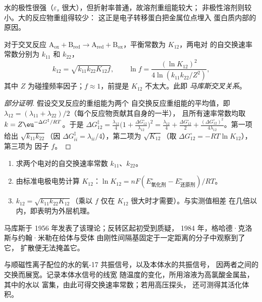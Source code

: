 \admitted

水的极性很强（$\varepsilon_s$ 很大），但折射率普通，故溶剂重组能较大；
非极性溶剂则较小。大的反应物重组得较少：
这正是电子转移蛋白把金属位点埋入
蛋白质内部的原因。

\begin{theorem}[马库斯交叉关系]\label{thm:b3:complex-mechanisms:cross-relation}
对于交叉反应 $\mathrm{A_{ox} + B_{red} \to A_{red} + B_{ox}}$，平衡常数为 $K_{12}$，两电对
的自交换速率常数分别为 $k_{11}$ 和 $k_{22}$，
\[
  k_{12} = \sqrt{k_{11}k_{22}K_{12}f}, \qquad \ln f = \frac{(\ln K_{12})^2}{4\ln(k_{11}k_{22}/Z^2)},
\]
其中 $Z$ 为碰撞频率因子；$f \approx 1$，前提是 $K_{12}$ 不太大。此即
\emph{马库斯交叉关系}。
\end{theorem}

\begin{proof}[部分证明]
假设交叉反应的重组能为两个
自交换反应重组能的平均值，即 $\lambda_{12} = (\lambda_{11} + \lambda_{22})/2$（每个反应物贡献其自身的一半），
且所有速率常数均取 $k = Z\eu^{-\Delta G^{\ddagger}/RT}$。于是
$\Delta G_{12}^{\ddagger} = \frac{\lambda_{12}}{4}\bigl(1 + \frac{\Delta G^\circ_{12}}{\lambda_{12}}\bigr)^2 = \frac{\lambda_{12}}{4} + \frac{\Delta G^\circ_{12}}{2} + \frac{(\Delta G^\circ_{12})^2}{4\lambda_{12}}$。第一项给出
$\sqrt{k_{11}k_{22}}$（因 $\Delta G^{\ddagger}_{ii} = \lambda_{ii}/4$），第二项为 $\sqrt{K_{12}}$（取 $\Delta G^\circ_{12} = -RT\ln K_{12}$），第三项为
因子 $f$。
\end{proof}

\begin{method}[由自交换数据求交叉反应速率]\label{met:b3:complex-mechanisms:marcus-estimate}
\begin{enumerate}
  \item 求两个电对的自交换速率常数 $k_{11}$、$k_{22}$。
  \item 由标准电极电势计算 $K_{12}$：$\ln K_{12} = nF(E^\circ_{\text{氧化剂}} - E^\circ_{\text{还原剂}})/RT$。
  \item $k_{12} = \sqrt{k_{11}k_{22}K_{12}}$（乘以 $f$ 仅在 $K_{12}$ 很大时才需要）。与实测值相差
        在几倍以内，即表明为外层机理。
\end{enumerate}
\end{method}

马库斯于 1956 年发表了该理论；反转区起初受到质疑，
1984 年，格哈德·克洛斯与约翰·米勒在给体与受体
由刚性间隔基固定于一定距离的分子中观察到了它，
扩散便无法掩盖它。

\begin{inthelab}[氧-17 核磁共振测定水交换]
与顺磁性离子配位的水的氧-17 共振信号，以及本体水的共振信号，
因两者之间的交换而展宽。记录本体水信号的线宽
随温度的变化，所用溶液为高氯酸金属盐，
其中的水以  富集，由此可得交换速率常数；若用高压探头，
还可测得其活化体积。
\end{inthelab}

